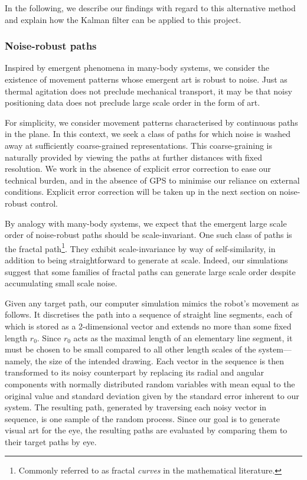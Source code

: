         In the following, we describe our findings with regard to this alternative method and explain how the Kalman filter can be applied to this project.

        \subsubsection{Noise-robust paths}
        Inspired by emergent phenomena in many-body systems, we consider the existence of movement patterns whose emergent art is robust to noise.
        Just as thermal agitation does not preclude mechanical transport, it may be that noisy positioning data does not preclude large scale order in the form of art.

        For simplicity, we consider movement patterns characterised by continuous paths in the plane.
        In this context, we seek a class of paths for which noise is washed away at sufficiently coarse-grained representations.
        This coarse-graining is naturally provided by viewing the paths at further distances with fixed resolution.
        We work in the absence of explicit error correction to ease our technical burden, and in the absence of GPS to minimise our reliance on external conditions.
        Explicit error correction will be taken up in the next section on noise-robust control.

        By analogy with many-body systems, we expect that the emergent large scale order of noise-robust paths should be scale-invariant.
        One such class of paths is the fractal path\footnote{Commonly referred to as fractal \emph{curves} in the mathematical literature.}.
        They exhibit scale-invariance by way of self-similarity, in addition to being straightforward to generate at scale.
        Indeed, our simulations suggest that some families of fractal paths can generate large scale order despite accumulating small scale noise.

        Given any target path, our computer simulation mimics the robot's movement as follows.
        It discretises the path into a sequence of straight line segments, each of which is stored as a 2-dimensional vector and extends no more than some fixed length $r_0$.
        Since $r_0$ acts as the maximal length of an elementary line segment, it must be chosen to be small compared to all other length scales of the system---namely, the size of the intended drawing.
        Each vector in the sequence is then transformed to its noisy counterpart by replacing its radial and angular components with normally distributed random variables with mean equal to the original value and standard deviation given by the standard error inherent to our system.
        The resulting path, generated by traversing each noisy vector in sequence, is one sample of the random process.
        Since our goal is to generate visual art for the eye, the resulting paths are evaluated by comparing them to their target paths by eye.

